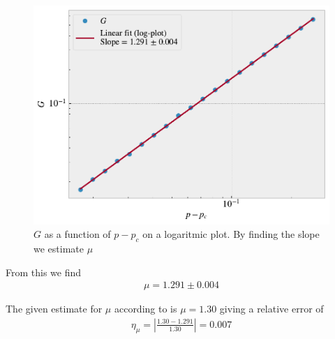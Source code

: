 \documentclass[reprint, amsmath, amssymb, aps]{revtex4-2}
\begin{document}
\begin{figure}[H]
  \includegraphics[width=\linewidth]{figures/mu.pdf}
  \caption{$G$ as a function of $p-p_c$ on a logaritmic plot. By finding the slope we estimate $\mu$}
  \label{fig:mu}
\end{figure}
From this we find
\begin{align*}
  \mu = 1.291 \pm 0.004
\end{align*}




The given estimate for $\mu$ according to \cite{textbook} is $\mu = 1.30$ giving a relative error of
\begin{align*}
  \eta_\mu= \left|\frac{1.30 - 1.291}{1.30}\right| = 0.007
\end{align*}


\clearpage
\end{document}
